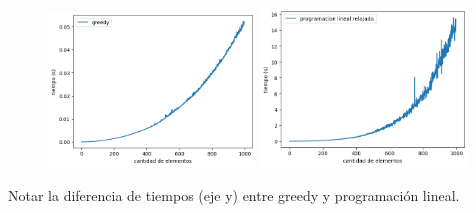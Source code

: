 \begin{figure}[H]
    \centering
    \includegraphics[width=0.49\textwidth]{img/greedy.png}
    \includegraphics[width=0.49\textwidth]{img/pl_rlx.png}
\end{figure}

Notar la diferencia de tiempos (eje y) entre greedy y programación lineal.
